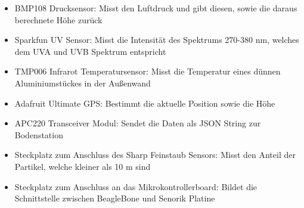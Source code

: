\begin{itemize}
	\item BMP108 Drucksensor: Misst den Luftdruck und gibt diesen, sowie die daraus berechnete Höhe zurück
	\item Sparkfun UV Sensor: Misst die Intensität des Spektrums 270-380 nm, welches dem UVA und UVB Spektrum entspricht
	\item TMP006 Infrarot Temperatursensor: Misst die Temperatur eines dünnen Aluminiumstückes in der Außenwand 
	\item Adafruit Ultimate GPS: Bestimmt die aktuelle Position sowie die Höhe
	\item APC220 Transceiver Modul: Sendet die Daten als JSON String zur Bodenstation
	\item Steckplatz zum Anschluss des Sharp Feinstaub Sensors: Misst den Anteil der Partikel, welche kleiner als 10 \textmu m sind
	\item Steckplatz zum Anschluss an das Mikrokontrollerboard: Bildet die Schnittstelle zwischen BeagleBone und Senorik Platine
\end{itemize}

